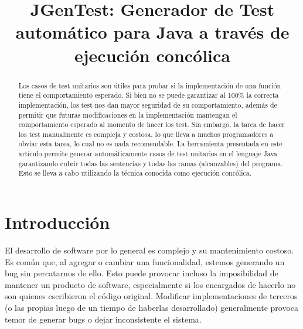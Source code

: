 \documentclass{llncs}
\title{JGenTest: Generador de Test automático para Java a través de ejecución concólica}
\author{}	%
\institute{}	%
\begin{document}
\maketitle

\begin{abstract}
Los casos de test unitarios son útiles para probar si la implementación de una función tiene el comportamiento esperado.
Si bien no se puede garantizar al 100\% la correcta implementación, los test nos dan mayor seguridad de su comportamiento,
además de permitir que futuras modificaciones en la implementación mantengan el comportamiento esperado al momento de hacer los test.
Sin embargo, la tarea de hacer los test manualmente es compleja y costosa, lo que lleva a muchos programadores a obviar esta tarea,
lo cual no es nada recomendable. La herramienta presentada en este artículo permite generar automáticamente casos de test unitarios
en el lenguaje Java garantizando cubrir todas las sentencias y todas las ramas (alcanzables) del programa. Esto se lleva a cabo
utilizando la técnica conocida como ejecución concólica.

\end{abstract}



\section{Introducción}
El desarrollo de software por lo general es complejo y su mantenimiento costoso. Es común que, al agregar o cambiar una funcionalidad, estemos generando un bug sin percatarnos de ello.
Esto puede provocar incluso la imposibilidad de mantener un producto de software, especialmente si los encargados de hacerlo no son quienes escribieron el código original.
Modificar implementaciones de terceros (o las propias luego de un tiempo de haberlas desarrollado) generalmente provoca temor de generar bugs o dejar inconsistente el sistema. 
\end{document}
